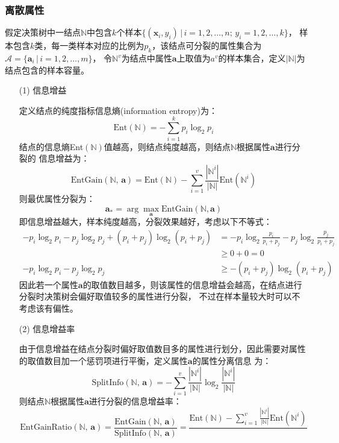 \documentclass[a4paper]{article}
\begin{document}
		\subsubsection{离散属性}
		假定决策树中一结点$\mathbb{N}$中包含$k$个样本$\{(\textbf{x}_i,y_i)\,|\,i=1,2,\dots,n;\,y_i=1,2,\dots,k\}$，
		样本包含$k$类，每一类样本对应的比例为$p_k$，该结点可分裂的属性集合为$\mathcal{A}=\{\textbf{a}_i\,|\,i=1,2,\dots,m\}$，
		令$\mathbb{N}^{v}$为结点中属性$\textbf{a}$上取值为$a^v$的样本集合，定义$|\mathbb{N}|$为结点包含的样本容量。
			    \begin{itemize}
					\item[(1)]	信息增益\par
						定义结点的纯度指标信息熵(information entropy)为：
						$$\text{Ent}(\mathbb{N}) = -\sum_{i=1}^{k}p_i\log_2p_i$$
						结点的信息熵Ent$(\mathbb{N})$值越高，则结点纯度越高，则结点$\mathbb{N}$根据属性$\textbf{a}$进行分裂的
						信息增益为：
						$$\text{EntGain}(\mathbb{N},\,\textbf{a}) = \text{Ent}(\mathbb{N}) - \sum_{i=1}^{v}\frac{|\mathbb{N}^{i}|}{|\mathbb{N}|}\text{Ent}(\mathbb{N}^{i})$$
						则最优属性分裂为：
						$$\textbf{a}_{*} = \arg \max_{\textbf{a}}\text{EntGain}(\mathbb{N}, \textbf{a})$$
						即信息增益越大，样本纯度越高，分裂效果越好，考虑以下不等式：
						\begin{align*}
								-p_i\log_2p_i-p_j\log_2p_j+(p_i+p_j)\log_2(p_i+p_j) &= -p_i\log_2\frac{p_i}{p_i+p_j}-p_j\log_2\frac{p_j}{p_i+p_j}\\
																	&\geq 0+0 = 0\\
												-p_i\log_2p_i-p_j\log_2p_j 	&\geq -(p_i+p_j)\log_2(p_i+p_j)
						\end{align*}
						因此若一个属性$\textbf{a}$的取值数目越多，则该属性的信息增益会越高，在结点进行分裂时决策树会偏好取值较多的属性进行分裂，
						不过在样本量较大时可以不考虑该有偏性。
					\item[(2)] 	信息增益率\par
						由于信息增益在结点分裂时偏好取值数目多的属性进行划分，因此需要对属性的取值数目加一个惩罚项进行平衡，定义属性$\textbf{a}$的属性分离信息
						为：
						$$\text{SplitInfo}(\mathbb{N},\,\textbf{a}) = 
						       - \sum_{i=1}^{v}\frac{|\mathbb{N}^{i}|}{|\mathbb{N}|}\log_2\frac{|\mathbb{N}^{i}|}{|\mathbb{N}|}$$
						则结点$\mathbb{N}$根据属性$\textbf{a}$进行分裂的信息增益率：
						$$\text{EntGainRatio}(\mathbb{N},\,\textbf{a}) 
							= 	\frac{\text{EntGain}(\mathbb{N},\,\textbf{a})}{\text{SplitInfo}(\mathbb{N},\,\textbf{a})}
							= 	\frac{\text{Ent}(\mathbb{N}) - \sum_{i=1}^{v}\frac{|\mathbb{N}^{i}|}{|\mathbb{N}|}\text{Ent}(\mathbb{N}^{i})}{
}$$
\end{itemize}
\end{document}
